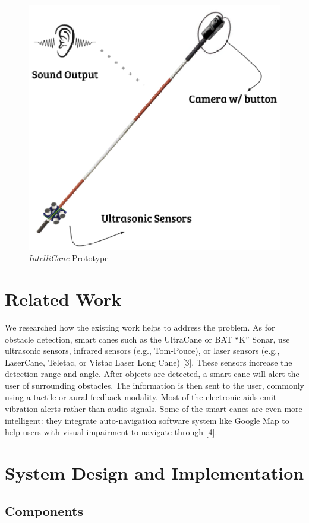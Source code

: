 \begin{figure}
  \includegraphics{cane}
  \caption{\textit{IntelliCane} Prototype}
\end{figure}

\section{Related Work}
We researched how the existing work helps to address the problem. As for obstacle detection, smart canes such as the UltraCane or BAT “K” Sonar, use ultrasonic sensors, infrared sensors (e.g., Tom-Pouce), or laser sensors (e.g., LaserCane, Teletac, or Vistac Laser Long Cane) [3]. These sensors increase the detection range and angle. After objects are detected, a smart cane will alert the user of surrounding obstacles. The information is then sent to the user, commonly using a tactile or aural feedback modality. Most of the electronic aids emit vibration alerts rather than audio signals. Some of the smart canes are even more intelligent: they integrate auto-navigation software system like Google Map to help users with visual impairment to navigate through [4].


\section{System Design and Implementation}
\subsection{Components}

